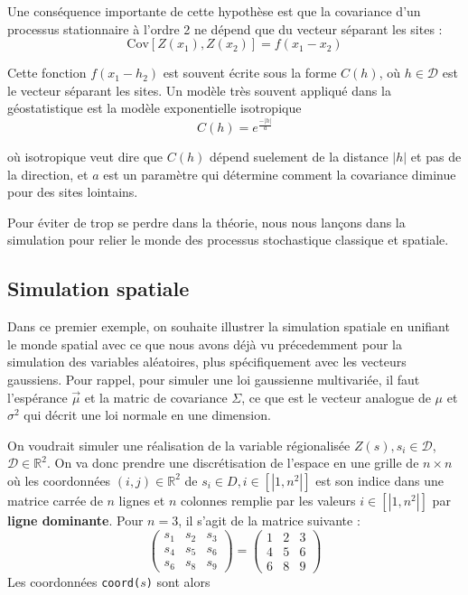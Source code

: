 \documentclass[10pt]{article} %
\begin{document}
Une conséquence importante de cette hypothèse est que la covariance d'un processus stationnaire à l'ordre 2 ne dépend que du vecteur séparant les sites :
    $$ \mathrm{Cov}[Z(x_1), Z(x_2)] = f(x_1 - x_2) $$

Cette fonction $f(x_1 - h_2)$ est souvent écrite sous la forme $C(h)$, où $h \in \mathcal{D}$ est le vecteur séparant les sites. Un modèle très souvent appliqué dans la géostatistique est la modèle exponentielle isotropique
$$ C(h) = e^{\frac{-|h|}{a}} $$

où isotropique veut dire que $C(h)$ dépend suelement de la distance $|h|$ et pas de la direction, et $a$ est un paramètre qui détermine comment la covariance diminue pour des sites lointains.

Pour éviter de trop se perdre dans la théorie, nous nous lan\c cons dans la simulation pour relier le monde des processus stochastique classique et spatiale.

\subsection{Simulation spatiale}

Dans ce premier exemple, on souhaite illustrer la simulation spatiale en unifiant le monde spatial avec ce que nous avons déjà vu précedemment pour la simulation des variables aléatoires,
plus spécifiquement avec les vecteurs gaussiens. Pour rappel, pour simuler une loi gaussienne multivariée, il faut l'espérance $\vec\mu$ et la matric de covariance $\Sigma$,
ce que est le vecteur analogue de $\mu$ et $\sigma^2$ qui décrit une loi normale en une dimension.

On voudrait simuler une réalisation de la variable régionalisée $Z(s), s_i \in \mathcal{D}$, $\mathcal{D} \in \mathbb{R}^2$.
On va donc prendre une discrétisation de l'espace en une grille de $n \times n$ où les coordonnées
$(i, j) \in \mathbb{R}^2$ de $s_i \in D, i \in [|1, n^2|]$ est son indice dans une matrice carrée de $n$ lignes et $n$
colonnes remplie par les valeurs $i \in [|1, n^2|]$ par \textbf{ligne dominante}. Pour $n = 3$, il s'agit de la matrice suivante :
$$
    \begin{pmatrix}
        s_1 & s_2 & s_3 \\
        s_4 & s_5 & s_6 \\
        s_6 & s_8 & s_9
    \end{pmatrix}
    =
    \begin{pmatrix}
        1 & 2 & 3 \\
        4 & 5 & 6 \\
        6 & 8 & 9
    \end{pmatrix}
$$
Les coordonnées \texttt{coord($s$)} sont alors
\end{document}
